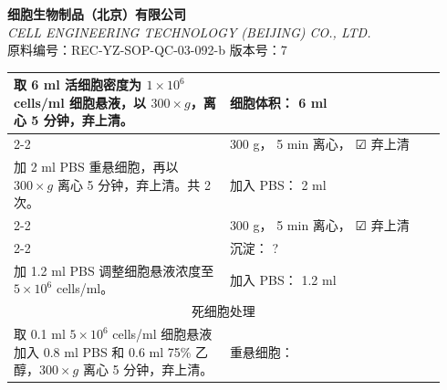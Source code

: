 \documentclass[UTF8,10pt,a4paper,fontset=fandol]{ctexart}
\newcommand{\fieldvalue}[1]{#1}
\newcommand{\handwritten}[1]{#1}
\newcommand{\checkboxfield}[1]{\ifstrequal{#1}{checked}{☑}{\ifstrequal{#1}{unclear}{?}{☐}}}
\begin{document}

\newpage

\begin{center}
\textbf{细胞生物制品（北京）有限公司}\\
\textit{CELL ENGINEERING TECHNOLOGY (BEIJING) CO., LTD.}\\[2pt]
原料编号：REC-YZ-SOP-QC-03-092-b \qquad 版本号：7
\end{center}

\begin{tabular}{|p{0.47\linewidth}|p{0.47\linewidth}|}
\hline
取 6 ml 活细胞密度为 $1\times10^{6}$ cells/ml 细胞悬液，以 $300\times g$，离心 5 分钟，弃上清。
&
细胞体积：
\fieldvalue{\handwritten{6}} ml
\\ \cline{2-2}
&
\fieldvalue{\handwritten{300}} g， 
\fieldvalue{\handwritten{5}} min 离心，
\fieldvalue{\checkboxfield{checked}} 弃上清
\\ \hline
加 2 ml PBS 重悬细胞，再以 $300\times g$ 离心 5 分钟，弃上清。共 2 次。
&
加入 PBS：
\fieldvalue{\handwritten{2}} ml
\\ \cline{2-2}
&
\fieldvalue{\handwritten{300}} g，
\fieldvalue{\handwritten{5}} min 离心，
\fieldvalue{\checkboxfield{checked}} 弃上清
\\ \cline{2-2}
&
沉淀：
\handwritten{?}
\\ \hline
加 1.2 ml PBS 调整细胞悬液浓度至 $5\times10^{6}$ cells/ml。
&
加入 PBS：
\fieldvalue{\handwritten{1.2}} ml
\\ \hline
\multicolumn{2}{|c|}{死细胞处理}\\ \hline
取 0.1 ml $5\times10^{6}$ cells/ml 细胞悬液加入 0.8 ml PBS 和 0.6 ml 75\% 乙醇，$300\times g$ 离心 5 分钟，弃上清。
&
重悬细胞：

\end{tabular}
\end{document}
